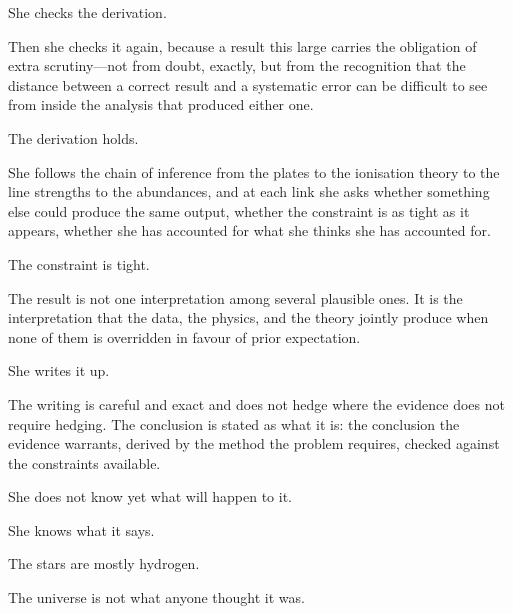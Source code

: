 She checks the derivation.

Then she checks it again, because a result
this large carries the obligation of extra
scrutiny---not from doubt, exactly, but from
the recognition that the distance between
a correct result and a systematic error can
be difficult to see from inside the analysis
that produced either one.

The derivation holds.

She follows the chain of inference from the
plates to the ionisation theory to the line
strengths to the abundances, and at each link
she asks whether something else could produce
the same output, whether the constraint is
as tight as it appears, whether she has
accounted for what she thinks she has accounted
for.

The constraint is tight.

The result is not one interpretation among
several plausible ones. It is the interpretation
that the data, the physics, and the theory
jointly produce when none of them is overridden
in favour of prior expectation.

She writes it up.

The writing is careful and exact and does not
hedge where the evidence does not require
hedging. The conclusion is stated as what it
is: the conclusion the evidence warrants,
derived by the method the problem requires,
checked against the constraints available.

She does not know yet what will happen to it.

She knows what it says.

The stars are mostly hydrogen.

The universe is not what anyone thought it was.


